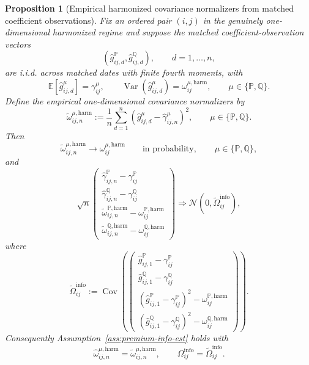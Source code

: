\documentclass[11pt,a4paper]{amsart}
\theoremstyle{plain}
\newtheorem{proposition}[theorem]{Proposition}
\theoremstyle{definition}
\theoremstyle{remark}
\DeclareMathOperator{\Var}{Var}
\DeclareMathOperator{\Cov}{Cov}
\newcommand{\PP}{\mathbb{P}}
\newcommand{\QQ}{\mathbb{Q}}
\newcommand{\EE}{\mathbb{E}}
\begin{document}
\begin{proposition}[Empirical harmonized covariance normalizers from matched coefficient observations]\label{prop:premium-info-normalizers}
Fix an ordered pair \((i,j)\) in the genuinely one-dimensional harmonized regime and suppose the
matched coefficient-observation vectors
\[
        \left(
                \widehat g_{ij,d}^\PP,
                \widehat g_{ij,d}^\QQ
        \right),
        \qquad
        d=1,\dots,n,
\]
are i.i.d. across matched dates with finite fourth moments, with
\[
        \EE[\widehat g_{ij,d}^\mu]=\gamma_{ij}^\mu,
        \qquad
        \Var(\widehat g_{ij,d}^\mu)=\omega_{ij}^{\mu,\mathrm{harm}},
        \qquad
        \mu\in\{\PP,\QQ\}.
\]
Define the empirical one-dimensional covariance normalizers by
\[
        \widetilde\omega_{ij,n}^{\mu,\mathrm{harm}}
        :=
        \frac1n
        \sum_{d=1}^n
        \left(
                \widehat g_{ij,d}^\mu-\widehat\gamma_{ij,n}^\mu
        \right)^2,
        \qquad
        \mu\in\{\PP,\QQ\}.
\]
Then
\[
        \widetilde\omega_{ij,n}^{\mu,\mathrm{harm}}
        \to
        \omega_{ij}^{\mu,\mathrm{harm}}
        \qquad\text{in probability},
        \qquad
        \mu\in\{\PP,\QQ\},
\]
and
\[
        \sqrt{n}
        \begin{pmatrix}
                \widehat\gamma_{ij,n}^\PP-\gamma_{ij}^\PP\\
                \widehat\gamma_{ij,n}^\QQ-\gamma_{ij}^\QQ\\
                \widetilde\omega_{ij,n}^{\PP,\mathrm{harm}}-\omega_{ij}^{\PP,\mathrm{harm}}\\
                \widetilde\omega_{ij,n}^{\QQ,\mathrm{harm}}-\omega_{ij}^{\QQ,\mathrm{harm}}
        \end{pmatrix}
        \Rightarrow
        \mathcal N(0,\widetilde\Omega_{ij}^{\mathrm{info}}),
\]
where
\[
        \widetilde\Omega_{ij}^{\mathrm{info}}
        :=
        \Cov\!\left(
                \begin{pmatrix}
                        \widehat g_{ij,1}^\PP-\gamma_{ij}^\PP\\
                        \widehat g_{ij,1}^\QQ-\gamma_{ij}^\QQ\\
                        (\widehat g_{ij,1}^\PP-\gamma_{ij}^\PP)^2-\omega_{ij}^{\PP,\mathrm{harm}}\\
                        (\widehat g_{ij,1}^\QQ-\gamma_{ij}^\QQ)^2-\omega_{ij}^{\QQ,\mathrm{harm}}
                \end{pmatrix}
        \right).
\]
Consequently Assumption~\ref{ass:premium-info-est} holds with
\[
        \widehat\omega_{ij,n}^{\mu,\mathrm{harm}}
        =
        \widetilde\omega_{ij,n}^{\mu,\mathrm{harm}},
        \qquad
        \Omega_{ij}^{\mathrm{info}}
        =
        \widetilde\Omega_{ij}^{\mathrm{info}}.
\]
\end{proposition}
\end{document}
